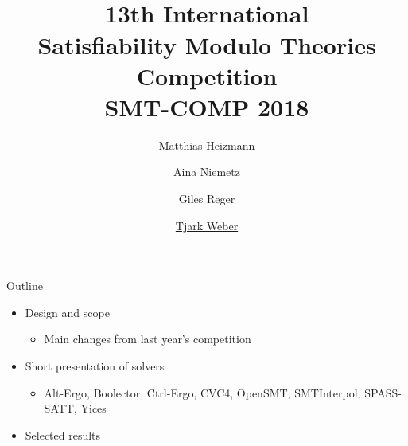 \documentclass{beamer}
\title[SMT-COMP 2018]{${}$\\[3.5em]13th International\\
Satisfiability Modulo Theories\\
Competition\\[.7em]
SMT-COMP 2018\\[3em]}
\author{Matthias Heizmann \and Aina Niemetz\\ \and Giles Reger \and
  \underline{Tjark Weber}}
\institute{}
\date{}
\begin{document}

\frame{\titlepage}
\logo{}


\section{}%
\subsection{}%


\begin{frame}{Outline}
  \begin{itemize}
  \item Design and scope

    \smallskip

    \begin{itemize}
    \item Main changes from last year's competition
    \end{itemize}

    \vfill

  \item Short presentation of solvers

    \smallskip

    \begin{itemize}
    \item Alt-Ergo, Boolector, Ctrl-Ergo, CVC4, OpenSMT, SMTInterpol,
      SPASS-SATT, Yices
    \end{itemize}

    \vfill

  \item Selected results
  \end{itemize}
\end{frame}


\begin{frame}{}
  \begin{center}
    \vfill
      {\huge {}}
    \vfill
  \end{center}
\end{frame}
\end{document}
